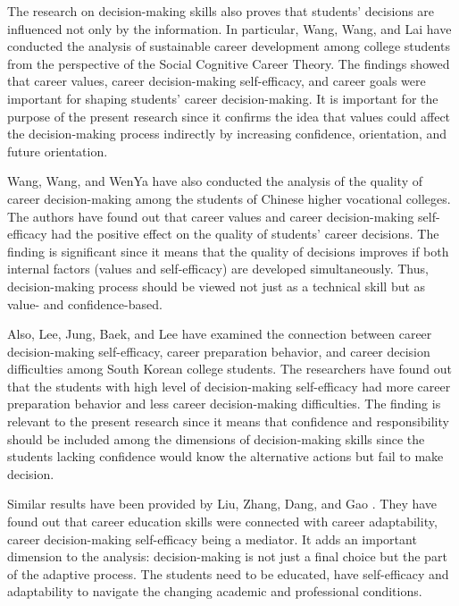 \documentclass[10pt]{NSP1}
\begin{document}
The research on decision-making skills also proves that students' decisions are influenced not only by the information. In particular, Wang, Wang, and Lai \cite{ref28} have conducted the analysis of sustainable career development among college students from the perspective of the Social Cognitive Career Theory. The findings showed that career values, career decision-making self-efficacy, and career goals were important for shaping students' career decision-making. It is important for the purpose of the present research since it confirms the idea that values could affect the decision-making process indirectly by increasing confidence, orientation, and future orientation.

Wang, Wang, and WenYa \cite{ref28} have also conducted the analysis of the quality of career decision-making among the students of Chinese higher vocational colleges. The authors have found out that career values and career decision-making self-efficacy had the positive effect on the quality of students' career decisions. The finding is significant since it means that the quality of decisions improves if both internal factors (values and self-efficacy) are developed simultaneously. Thus, decision-making process should be viewed not just as a technical skill but as value- and confidence-based.

Also, Lee, Jung, Baek, and Lee \cite{ref1} have examined the connection between career decision-making self-efficacy, career preparation behavior, and career decision difficulties among South Korean college students. The researchers have found out that the students with high level of decision-making self-efficacy had more career preparation behavior and less career decision-making difficulties. The finding is relevant to the present research since it means that confidence and responsibility should be included among the dimensions of decision-making skills since the students lacking confidence would know the alternative actions but fail to make decision.

Similar results have been provided by Liu, Zhang, Dang, and Gao \cite{ref29}. They have found out that career education skills were connected with career adaptability, career decision-making self-efficacy being a mediator. It adds an important dimension to the analysis: decision-making is not just a final choice but the part of the adaptive process. The students need to be educated, have self-efficacy and adaptability to navigate the changing academic and professional conditions.
\end{document}
